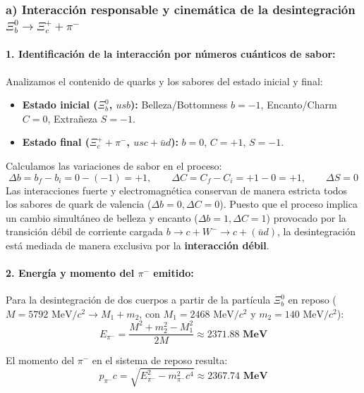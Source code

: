 \begin{problema}
\tcblower

\subsubsection*{a) Interacción responsable y cinemática de la desintegración $\Xi_b^0 \to \Xi_c^+ + \pi^-$}

\paragraph{1. Identificación de la interacción por números cuánticos de sabor:}
Analizamos el contenido de quarks y los sabores del estado inicial y final:
\begin{itemize}
    \item \textbf{Estado inicial ($\Xi_b^0$, $usb$):} Belleza/Bottomness $b = -1$, Encanto/Charm $C = 0$, Extrañeza $S = -1$.
    \item \textbf{Estado final ($\Xi_c^+ + \pi^-$, $usc + \bar{u}d$):} $b = 0$, $C = +1$, $S = -1$.
\end{itemize}
Calculamos las variaciones de sabor en el proceso:
\begin{equation*}
\Delta b = b_f - b_i = 0 - (-1) = +1, \qquad \Delta C = C_f - C_i = +1 - 0 = +1, \qquad \Delta S = 0
\end{equation*}
Las interacciones fuerte y electromagnética conservan de manera estricta todos los sabores de quark de valencia ($\Delta b = 0, \Delta C = 0$). Puesto que el proceso implica un cambio simultáneo de belleza y encanto ($\Delta b = 1, \Delta C = 1$) provocado por la transición débil de corriente cargada $b \to c + W^- \to c + (\bar{u}d)$, la desintegración está mediada de manera exclusiva por la \textbf{interacción débil}.

\paragraph{2. Energía y momento del $\pi^-$ emitido:}
Para la desintegración de dos cuerpos a partir de la partícula $\Xi_b^0$ en reposo ($M = 5792\text{ MeV}/c^2 \to M_1 + m_2$, con $M_1 = 2468\text{ MeV}/c^2$ y $m_2 = 140\text{ MeV}/c^2$):
\begin{equation*}
E_{\pi^-} = \frac{M^2 + m_2^2 - M_1^2}{2M} \approx \mathbf{2371.88\text{ MeV}}
\end{equation*}

El momento del $\pi^-$ en el sistema de reposo resulta:
\begin{equation*}
p_{\pi^-} c = \sqrt{E_{\pi^-}^2 - m_{\pi^-}^2 c^4} \approx \mathbf{2367.74\text{ MeV}}
\end{equation*}


\end{problema}
